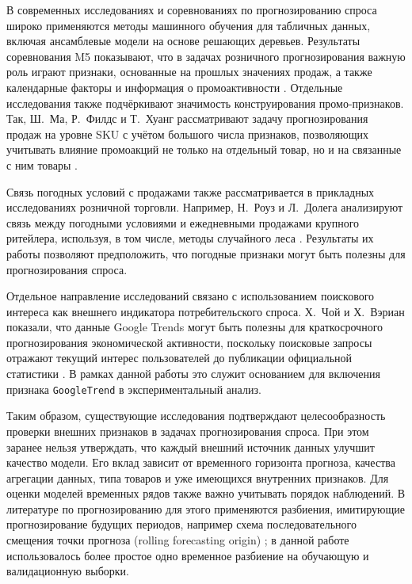 \documentclass[12pt,a4paper]{article}
\numberwithin{equation}{section}
\begin{document}
В современных исследованиях и соревнованиях по прогнозированию спроса широко применяются методы машинного обучения для табличных данных, включая ансамблевые модели на основе решающих деревьев. Результаты соревнования M5 показывают, что в задачах розничного прогнозирования важную роль играют признаки, основанные на прошлых значениях продаж, а также календарные факторы и информация о промоактивности \cite{makridakis2022m5}. Отдельные исследования также подчёркивают значимость конструирования промо-признаков. Так, Ш.~Ма, Р.~Филдс и Т.~Хуанг рассматривают задачу прогнозирования продаж на уровне SKU с учётом большого числа признаков, позволяющих учитывать влияние промоакций не только на отдельный товар, но и на связанные с ним товары \cite{ma2016demand}.

Связь погодных условий с продажами также рассматривается в прикладных исследованиях розничной торговли. Например, Н.~Роуз и Л.~Долега анализируют связь между погодными условиями и ежедневными продажами крупного ритейлера, используя, в том числе, методы случайного леса \cite{rose2022weather}. Результаты их работы позволяют предположить, что погодные признаки могут быть полезны для прогнозирования спроса.

Отдельное направление исследований связано с использованием поискового интереса как внешнего индикатора потребительского спроса. Х.~Чой и Х.~Вэриан показали, что данные Google Trends могут быть полезны для краткосрочного прогнозирования экономической активности, поскольку поисковые запросы отражают текущий интерес пользователей до публикации официальной статистики \cite{choi2012predicting}. В рамках данной работы это служит основанием для включения признака \texttt{GoogleTrend} в экспериментальный анализ.

Таким образом, существующие исследования подтверждают целесообразность проверки внешних признаков в задачах прогнозирования спроса. При этом заранее нельзя утверждать, что каждый внешний источник данных улучшит качество модели. Его вклад зависит от временного горизонта прогноза, качества агрегации данных, типа товаров и уже имеющихся внутренних признаков. Для оценки моделей временных рядов также важно учитывать порядок наблюдений. В литературе по прогнозированию для этого применяются разбиения, имитирующие прогнозирование будущих периодов, например схема последовательного смещения точки прогноза (rolling forecasting origin) \cite{hyndman2021fpp}; в данной работе использовалось более простое одно временное разбиение на обучающую и валидационную выборки.
\end{document}
